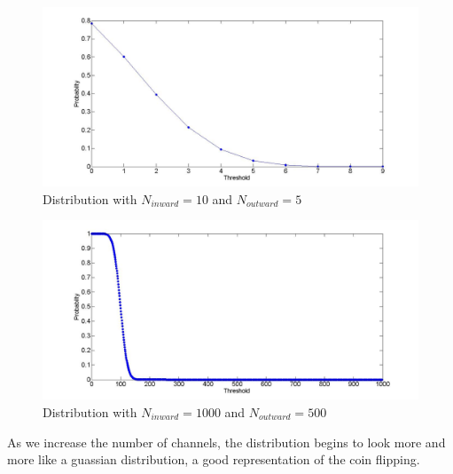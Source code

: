 \documentclass[a4paper]{article}
\begin{document}
   \begin{figure}[h]
   	\centering
   	\includegraphics[width=12cm]{p2}
   	\caption{Distribution with $N_{inward}=10$ and $N_{outward}=5$}
   \end{figure}
   
   \begin{figure}[H]
   	\centering
   	\includegraphics[width=12cm]{p3}
   	\caption{Distribution with $N_{inward}=1000$ and $N_{outward}=500$}
   \end{figure}  
   As we increase the number of channels, the distribution begins to look more and more like a guassian distribution, a good representation of the coin flipping.
       
\end{document}
